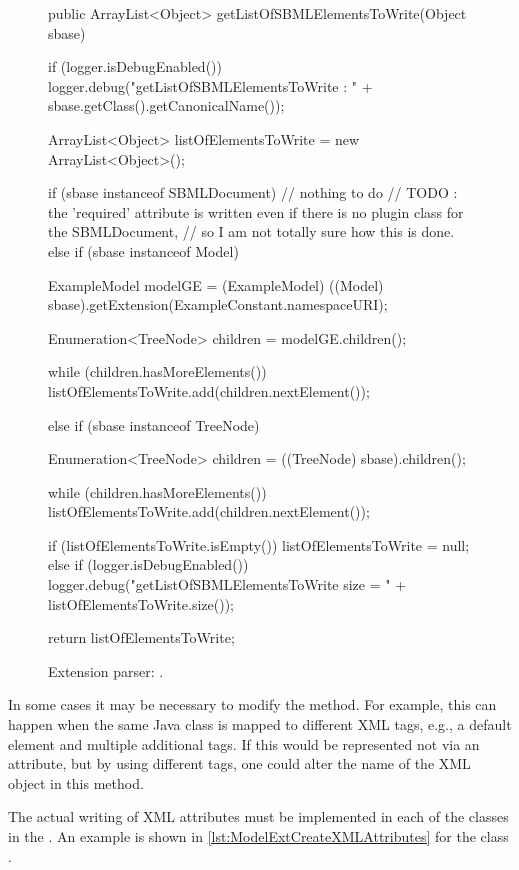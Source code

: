 \begin{figure}[htb]
  \begin{example}[numbers=left]
public ArrayList<Object> getListOfSBMLElementsToWrite(Object sbase) {

  if (logger.isDebugEnabled()) {
    logger.debug("getListOfSBMLElementsToWrite : " + sbase.getClass().getCanonicalName());
  }

  ArrayList<Object> listOfElementsToWrite = new ArrayList<Object>();

  if (sbase instanceof SBMLDocument) {
    // nothing to do
    // TODO : the 'required' attribute is written even if there is no plugin class for the SBMLDocument, 
    // so I am not totally sure how this is done.
  }
  else if (sbase instanceof Model) {
    ExampleModel modelGE = (ExampleModel) ((Model) sbase).getExtension(ExampleConstant.namespaceURI);

    Enumeration<TreeNode> children = modelGE.children();

    while (children.hasMoreElements()) {
      listOfElementsToWrite.add(children.nextElement());
    }
  }
  else if (sbase instanceof TreeNode) {
    Enumeration<TreeNode> children = ((TreeNode) sbase).children();

    while (children.hasMoreElements()) {
      listOfElementsToWrite.add(children.nextElement());
    }
  }

  if (listOfElementsToWrite.isEmpty()) {
    listOfElementsToWrite = null;
  } else if (logger.isDebugEnabled()) {
    logger.debug("getListOfSBMLElementsToWrite size = " + listOfElementsToWrite.size());
  }

  return listOfElementsToWrite;
}\end{example}
  \caption{Extension parser: .}
  \label{lst:ModelExtParserListSBMLToWrite}
\end{figure}

In some cases it may be necessary to modify the 
method.  For example, this can happen when the same Java class is mapped to
different XML tags, e.g., a default element and multiple additional tags.
If this would be represented not via an attribute, but by using different
tags, one could alter the name of the XML object in this method.

The actual writing of XML attributes must be implemented in each of the
classes in the .  An example is shown in 
\vref{lst:ModelExtCreateXMLAttributes} for the class .

